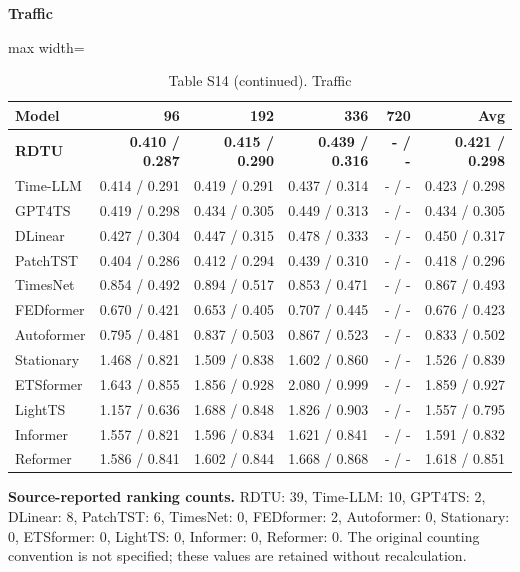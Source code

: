 \begin{table}[H]\centering\small
\caption*{Table S14 (continued). Traffic}
\textbf{Traffic}\par\smallskip
\begin{adjustbox}{max width=\linewidth}\begin{tabular}{lrrrrr}\toprule
\textbf{Model} & \textbf{96} & \textbf{192} & \textbf{336} & \textbf{720} & \textbf{Avg}\\\midrule
\rowcolor{blue!5}
\textbf{RDTU} & \textbf{0.410 / 0.287} & \textbf{0.415 / 0.290} & \textbf{0.439 / 0.316} & \textbf{- / -} & \textbf{0.421 / 0.298}\\
Time-LLM & 0.414 / 0.291 & 0.419 / 0.291 & 0.437 / 0.314 & - / - & 0.423 / 0.298\\
GPT4TS & 0.419 / 0.298 & 0.434 / 0.305 & 0.449 / 0.313 & - / - & 0.434 / 0.305\\
DLinear & 0.427 / 0.304 & 0.447 / 0.315 & 0.478 / 0.333 & - / - & 0.450 / 0.317\\
PatchTST & 0.404 / 0.286 & 0.412 / 0.294 & 0.439 / 0.310 & - / - & 0.418 / 0.296\\
TimesNet & 0.854 / 0.492 & 0.894 / 0.517 & 0.853 / 0.471 & - / - & 0.867 / 0.493\\
FEDformer & 0.670 / 0.421 & 0.653 / 0.405 & 0.707 / 0.445 & - / - & 0.676 / 0.423\\
Autoformer & 0.795 / 0.481 & 0.837 / 0.503 & 0.867 / 0.523 & - / - & 0.833 / 0.502\\
Stationary & 1.468 / 0.821 & 1.509 / 0.838 & 1.602 / 0.860 & - / - & 1.526 / 0.839\\
ETSformer & 1.643 / 0.855 & 1.856 / 0.928 & 2.080 / 0.999 & - / - & 1.859 / 0.927\\
LightTS & 1.157 / 0.636 & 1.688 / 0.848 & 1.826 / 0.903 & - / - & 1.557 / 0.795\\
Informer & 1.557 / 0.821 & 1.596 / 0.834 & 1.621 / 0.841 & - / - & 1.591 / 0.832\\
Reformer & 1.586 / 0.841 & 1.602 / 0.844 & 1.668 / 0.868 & - / - & 1.618 / 0.851\\
\bottomrule\end{tabular}\end{adjustbox}\end{table}
\noindent\textbf{Source-reported ranking counts.} RDTU: 39, Time-LLM: 10, GPT4TS: 2, DLinear: 8, PatchTST: 6, TimesNet: 0, FEDformer: 2, Autoformer: 0, Stationary: 0, ETSformer: 0, LightTS: 0, Informer: 0, Reformer: 0. The original counting convention is not specified; these values are retained without recalculation.\par
